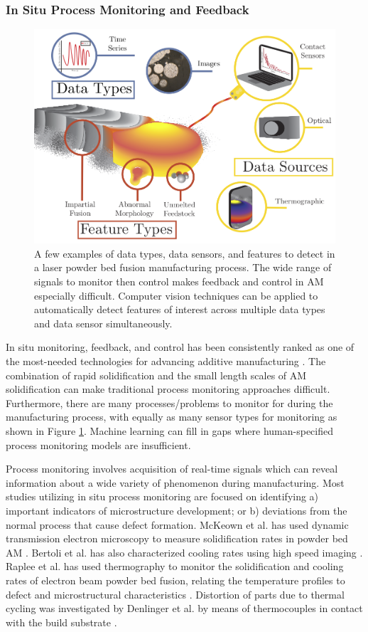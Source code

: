 \subsubsection{In Situ Process Monitoring and Feedback}
\begin{figure}
	\includegraphics[width=0.85\linewidth]{Images/melt_pool}
	\caption{A few examples of data types, data sensors, and features to detect in a laser powder bed fusion manufacturing process. The wide range of signals to monitor then control makes feedback and control in AM especially difficult. Computer vision techniques can be applied to automatically detect features of interest across multiple data types and data sensor simultaneously.}
	\label{fig:melt_pool}
\end{figure}

In situ monitoring, feedback, and control has been consistently ranked as one of the most-needed technologies for advancing additive manufacturing \cite{Berumen2010, Tapia2014, Mani2017}. The combination of rapid solidification and the small length scales of AM solidification can make traditional process monitoring approaches difficult. Furthermore, there are many processes/problems to monitor for during the manufacturing process, with equally as many sensor types for monitoring as shown in Figure \ref{fig:melt_pool}. Machine learning can fill in gaps where human-specified process monitoring models are insufficient.

Process monitoring involves acquisition of real-time signals which can reveal information about a wide variety of phenomenon during manufacturing. Most studies utilizing in situ process monitoring are focused on identifying a) important indicators of microstructure development; or b) deviations from the normal process that cause defect formation. McKeown et al. has used dynamic transmission electron microscopy to measure solidification rates in powder bed AM \cite{McKeown2016}. Bertoli et al. has also characterized cooling rates using high speed imaging \cite{Bertoli2017}. Raplee et al. has used thermography to monitor the solidification and cooling rates of electron beam powder bed fusion, relating the temperature profiles to defect and microstructural characteristics \cite{Raplee2017}. Distortion of parts due to thermal cycling was investigated by Denlinger et al. by means of thermocouples in contact with the build substrate \cite{Denlinger2015}. 

